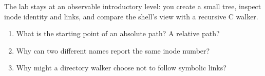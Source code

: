 The lab stays at an observable introductory level: you create a small tree, inspect inode identity and links, and compare the shell's view with a recursive C walker.

\begin{quickcheck}
\begin{enumerate}
  \item What is the starting point of an absolute path? A relative path?
  \item Why can two different names report the same inode number?
  \item Why might a directory walker choose not to follow symbolic links?
\end{enumerate}
\end{quickcheck}
